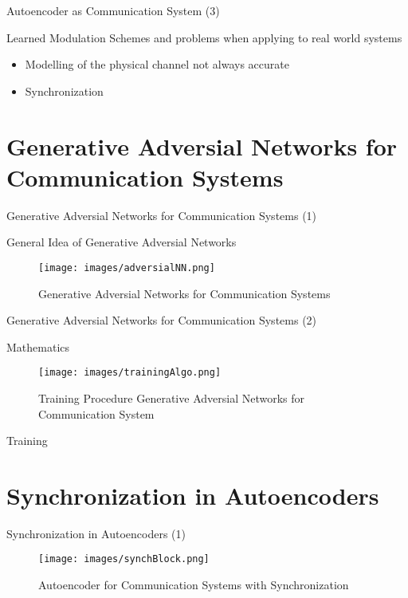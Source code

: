 \documentclass[xcolor=table,mathserif,9pt]{beamer}    %
\begin{document}
\begin{frame}{Autoencoder as Communication System (3)}

Learned Modulation Schemes and problems when applying to real world systems
\begin{itemize}
	\item Modelling of the physical channel not always accurate
	\item Synchronization
\end{itemize}


\end{frame}

\section{Generative Adversial Networks for Communication Systems}
\begin{frame}{Generative Adversial Networks for Communication Systems (1)}

General Idea of Generative Adversial Networks
\begin{figure}[htpb]
	\centering
	\texttt{[image: images/adversialNN.png]}
	\caption{Generative Adversial Networks for Communication Systems}
\end{figure}

\end{frame}

\begin{frame}{Generative Adversial Networks for Communication Systems (2)}

Mathematics
\begin{figure}[htpb]
	\centering
	\texttt{[image: images/trainingAlgo.png]}
	\caption{Training Procedure Generative Adversial Networks for Communication System}
\end{figure}
Training

\end{frame}

\section{Synchronization in Autoencoders}
\begin{frame}{Synchronization in Autoencoders (1)}

\begin{figure}[htpb]
	\centering
	\texttt{[image: images/synchBlock.png]}
	\caption{Autoencoder for Communication Systems with Synchronization}
\end{figure}
\end{frame}
\end{document}
